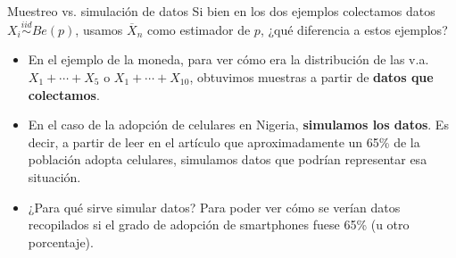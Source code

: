 \documentclass{beamer}
\theoremstyle{definition}
\begin{document}
\begin{frame}{\color{rosee}Muestreo vs. simulación de datos}
\small
Si bien en los dos ejemplos colectamos datos $X_i\stackrel{iid}{\sim} Be(p)$, usamos $\overline{X}_n$ como estimador de $p$, ¿qué diferencia a estos ejemplos?

    \begin{itemize}
        \item En el ejemplo de la moneda, para ver cómo era la distribución de las v.a. $X_1+\cdots +X_5$ o $X_1+\cdots +X_{10}$, obtuvimos muestras a partir de \textbf{datos que colectamos}.
        \item En el caso de la adopción de celulares en Nigeria, \textbf{simulamos los datos}. Es decir, a partir de leer en el artículo que aproximadamente un 65\% de la población adopta celulares, simulamos datos que podrían representar esa situación. 
        
        \item ¿Para qué sirve simular datos? Para poder ver cómo se verían datos recopilados si el grado de adopción de smartphones fuese 65\% (u otro porcentaje).
   \end{itemize}
\end{frame}


  
  
\end{document}
